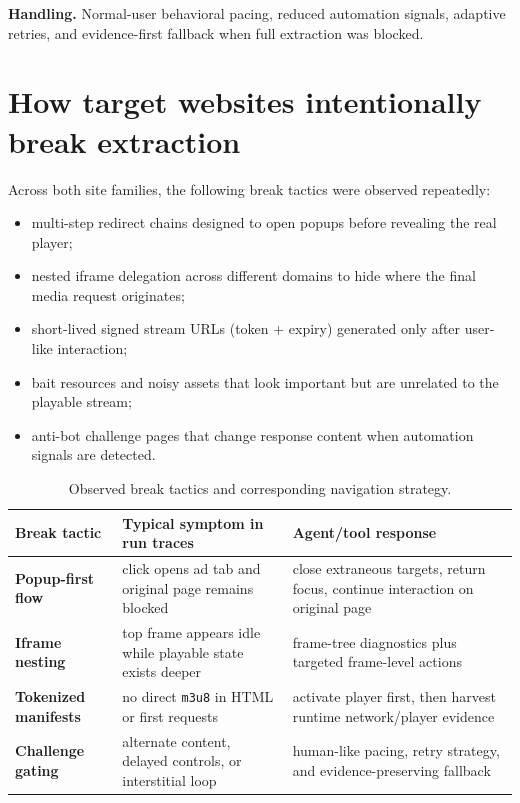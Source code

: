 \textbf{Handling.} Normal-user behavioral pacing, reduced automation signals, adaptive
retries, and evidence-first fallback when full extraction was blocked.

\section{How target websites intentionally break extraction}

Across both site families, the following break tactics were observed repeatedly:

\begin{itemize}
  \item multi-step redirect chains designed to open popups before revealing the real
    player;
  \item nested iframe delegation across different domains to hide where the final media
    request originates;
  \item short-lived signed stream URLs (token + expiry) generated only after user-like
    interaction;
  \item bait resources and noisy assets that look important but are unrelated to the
    playable stream;
  \item anti-bot challenge pages that change response content when automation signals
    are detected.
\end{itemize}

\begin{table}[H]
\centering
\begin{tabularx}{\textwidth}{>{\raggedright\arraybackslash\bfseries}p{3.1cm}
                              >{\raggedright\arraybackslash}X
                              >{\raggedright\arraybackslash}X}
\toprule
\rowcolor{accent!8}
Break tactic & Typical symptom in run traces & Agent/tool response \\
\midrule
Popup-first flow & click opens ad tab and original page remains blocked & close
  extraneous targets, return focus, continue interaction on original page \\
Iframe nesting & top frame appears idle while playable state exists deeper &
  frame-tree diagnostics plus targeted frame-level actions \\
Tokenized manifests & no direct \texttt{m3u8} in HTML or first requests & activate
  player first, then harvest runtime network/player evidence \\
Challenge gating & alternate content, delayed controls, or interstitial loop &
  human-like pacing, retry strategy, and evidence-preserving fallback \\
\bottomrule
\end{tabularx}
\caption{Observed break tactics and corresponding navigation strategy.}
\label{tab:break-tactics-map}
\end{table}

